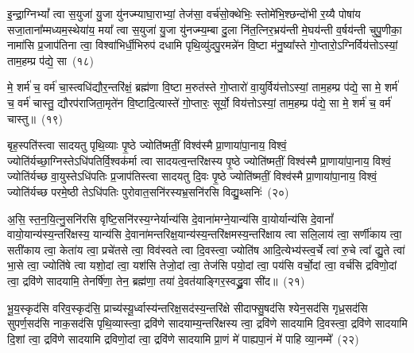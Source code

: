 {}%

इ॒न्द्रा॒ग्नि\-भ्यां᳚ त्वा स॒युजा॑ यु॒जा यु॑नज्म्याघा॒राभ्यां॒ तेज॑सा॒ वर्च॑सो॒क्थेभिः॒ स्तोमे॑भि॒श्छन्दो॑भी र॒य्यै पोषा॑य सजा॒ताना᳚म्मध्यम॒स्थेया॑य॒ मया᳚ त्वा स॒युजा॑ यु॒जा यु॑नज्म्य॒म्बा दु॒ला नि॑त॒त्निर॒भ्रय॑न्ती मे॒घय॑न्ती व॒र्\mbox{}षय॑न्ती चुपु॒णीका॒ नामा॑सि प्र॒जा\-प॑तिना त्वा॒ विश्वा॑भिर्धी॒भिरुप॑ दधामि पृथि॒व्यु॑दपु॒रमन्ने॑न वि॒ष्टा म॑नु॒ष्या᳚स्ते गो॒प्तारो॒\-ऽग्निर्विय॑त्तो\-ऽस्यां॒ ताम॒हम्प्र प॑द्ये॒ सा~(१८)

मे॒ शर्म॑ च॒ वर्म॑ चा॒स्त्वधि॑द्यौर॒न्तरि॑क्षं॒ ब्रह्म॑णा वि॒ष्टा म॒रुत॑स्ते गो॒प्तारो॑ वा॒युर्विय॑त्तो\-ऽस्यां॒ ताम॒हम्प्र प॑द्ये॒ सा मे॒ शर्म॑ च॒ वर्म॑ चास्तु॒ द्यौरप॑राजिता॒मृते॑न वि॒ष्टादि॒त्यास्ते॑ गो॒प्तारः॒ सूर्यो॒ विय॑त्तो\-ऽस्यां॒ ताम॒हम्प्र प॑द्ये॒ सा मे॒ शर्म॑ च॒ वर्म॑ चास्तु॥~(१९)

{\anuvakamend[{सा\-ऽष्टाच॑त्वारिꣳशच्च}]}%

बृह॒स्पति॑स्त्वा सादयतु पृथि॒व्याः पृ॒ष्ठे ज्योति॑ष्मतीं॒ विश्व॑स्मै प्रा॒णाया॑पा॒नाय॒ विश्वं॒ ज्योति॑र्यच्छा॒ग्निस्ते\-ऽधि॑पतिर्\-वि॒श्वक॑र्मा त्वा सादयत्व॒न्तरि॑क्षस्य पृ॒ष्ठे ज्योति॑ष्मतीं॒ विश्व॑स्मै प्रा॒णाया॑पा॒नाय॒ विश्वं॒ ज्योति॑र्यच्छ वा॒युस्ते\-ऽधि॑पतिः प्र॒जा\-प॑तिस्त्वा सादयतु दि॒वः पृ॒ष्ठे ज्योति॑ष्मतीं॒ विश्व॑स्मै प्रा॒णाया॑पा॒नाय॒ विश्वं॒ ज्योति॑र्यच्छ परमे॒ष्ठी ते\-ऽधि॑पतिः पुरोवात॒सनि॑रस्यभ्र॒सनि॑रसि विद्यु॒थ्सनिः॑~(२०)

अ॒सि॒ स्त॒न॒यि॒त्नु॒सनि॑रसि वृष्टि॒सनि॑रस्य॒ग्नेर्यान्य॑सि दे॒वाना॑मग्ने॒यान्य॑सि वा॒योर्यान्य॑सि दे॒वानां᳚ वायो॒यान्य॑स्य॒न्तरि॑क्षस्य॒ यान्य॑सि दे॒वाना॑मन्तरिक्ष॒यान्य॑स्य॒न्तरि॑क्षमस्य॒न्तरि॑क्षाय त्वा सलि॒लाय॑ त्वा॒ सर्णी॑काय त्वा॒ सती॑काय त्वा॒ केता॑य त्वा॒ प्रचे॑तसे त्वा॒ विव॑स्वते त्वा दि॒वस्त्वा॒ ज्योति॑ष आदि॒त्येभ्य॑स्त्व॒र्चे त्वा॑ रु॒चे त्वा᳚ द्यु॒ते त्वा॑ भा॒से त्वा॒ ज्योति॑षे त्वा यशो॒दां त्वा॒ यश॑सि तेजो॒दां त्वा॒ तेज॑सि पयो॒दां त्वा॒ पय॑सि वर्चो॒दां त्वा॒ वर्च॑सि द्रविणो॒दां त्वा॒ द्रवि॑णे सादयामि॒ तेनर्\mbox{}षि॑णा॒ तेन॒ ब्रह्म॑णा॒ तया॑ दे॒वत॑याङ्गिर॒स्वद्ध्रु॒वा सी॑द॥~(२१)

{\anuvakamend[{वि॒द्यु॒थ्सनि॑र्द्यु॒त्वैका॒न्नत्रि॒ꣳ॒शच्च॑}]}%

भू॒य॒स्कृद॑सि वरिव॒स्कृद॑सि॒ प्राच्य॑स्यू॒र्ध्वास्य॑न्तरिक्ष॒सद॑स्य॒न्तरि॑क्षे सीदाफ्सु॒षद॑सि श्येन॒सद॑सि गृध्र॒सद॑सि सुपर्ण॒सद॑सि नाक॒सद॑सि पृथि॒व्यास्त्वा॒ द्रवि॑णे सादयाम्य॒न्तरि॑क्षस्य त्वा॒ द्रवि॑णे सादयामि दि॒वस्त्वा॒ द्रवि॑णे सादयामि दि॒शां त्वा॒ द्रवि॑णे सादयामि द्रविणो॒दां त्वा॒ द्रवि॑णे सादयामि प्रा॒णं मे॑ पाह्यपा॒नं मे॑ पाहि व्या॒नम्मे᳚~(२२)

